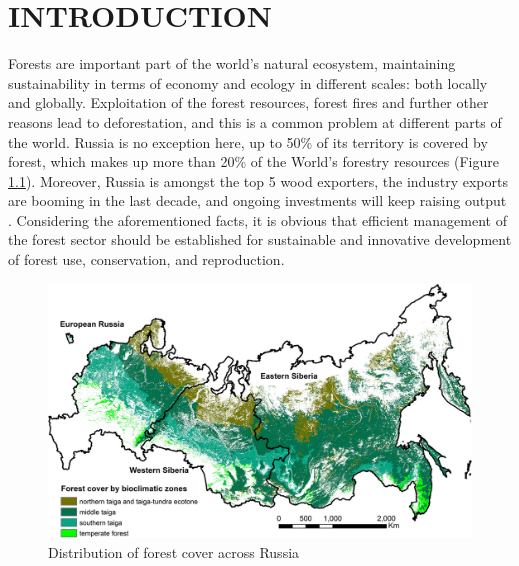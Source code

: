 \renewcommand\chaptername{}
\chapter{INTRODUCTION}

Forests are important part of the world's natural ecosystem, maintaining sustainability in terms of economy and ecology in different scales: both locally and globally. 
Exploitation of the forest resources, forest fires and further other reasons lead to deforestation, and this is a common problem at different parts of the world. Russia is no exception here, up to 50\% of its territory is covered by  forest, which makes up more than 20\% of the World’s forestry resources (Figure \ref{Russ}). Moreover, Russia is amongst the top 5 wood exporters, the industry exports are booming in the last decade, and ongoing investments will keep raising output \cite{Taylor2018, Taylor2020, Wwf2007}. Considering the aforementioned facts, it is obvious that efficient management of the forest sector should be established for sustainable and innovative development of forest use, conservation, and reproduction.

\begin{figure}[ht]
\centering
\includegraphics[scale=0.4]{images/RussiaForestCover.png}
\caption{Distribution of forest cover across Russia \cite{Loboda2017}}
\label{Russ}
\end{figure}

